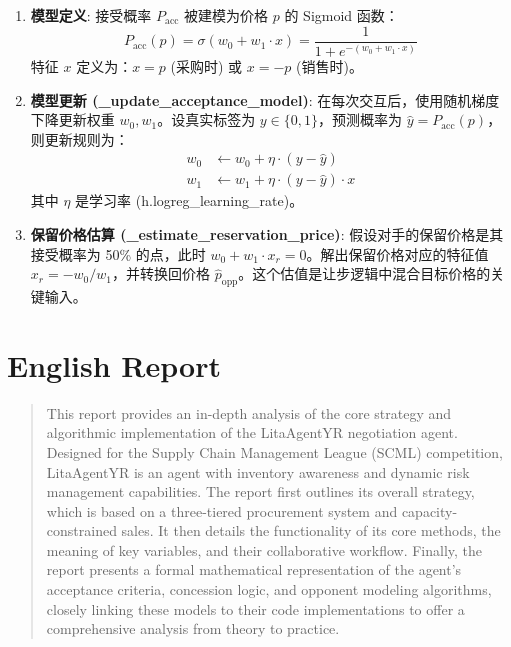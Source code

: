 \documentclass[12pt, a4paper]{article}
\begin{document}
\begin{enumerate}
\item \textbf{模型定义}: 接受概率 $P_{\text{acc}}$ 被建模为价格 $p$ 的 Sigmoid 函数：%
$$
P_{\text{acc}}(p) = \sigma(w_0 + w_1 \cdot x) = \frac{1}{1 + e^{-(w_0 + w_1 \cdot x)}}
$$
特征 $x$ 定义为：$x = p$ (采购时) 或 $x = -p$ (销售时)。

\item \textbf{模型更新 (\_update\_acceptance\_model)}: 在每次交互后，使用随机梯度下降更新权重 $w_0, w_1$。设真实标签为 $y \in \{0, 1\}$，预测概率为 $\hat{y} = P_{\text{acc}}(p)$，则更新规则为：%
$$
\begin{align*}
    w_0 & \leftarrow w_0 + \eta \cdot (y - \hat{y}) \\
    w_1 & \leftarrow w_1 + \eta \cdot (y - \hat{y}) \cdot x
\end{align*}
$$
其中 $\eta$ 是学习率 (h.logreg\_learning\_rate)。

\item \textbf{保留价格估算 (\_estimate\_reservation\_price)}: 假设对手的保留价格是其接受概率为 50\% 的点，此时 $w_0 + w_1 \cdot x_r = 0$。解出保留价格对应的特征值 $x_r = -w_0 / w_1$，并转换回价格 $\hat{p}_{\text{opp}}$。这个估值是让步逻辑中混合目标价格的关键输入。%
\end{enumerate}

\newpage
\section*{English Report}

\begin{abstract}
This report provides an in-depth analysis of the core strategy and algorithmic implementation of the LitaAgentYR negotiation agent. Designed for the Supply Chain Management League (SCML) competition, LitaAgentYR is an agent with inventory awareness and dynamic risk management capabilities. The report first outlines its overall strategy, which is based on a three-tiered procurement system and capacity-constrained sales. It then details the functionality of its core methods, the meaning of key variables, and their collaborative workflow. Finally, the report presents a formal mathematical representation of the agent's acceptance criteria, concession logic, and opponent modeling algorithms, closely linking these models to their code implementations to offer a comprehensive analysis from theory to practice.
\end{abstract}
\end{document}
